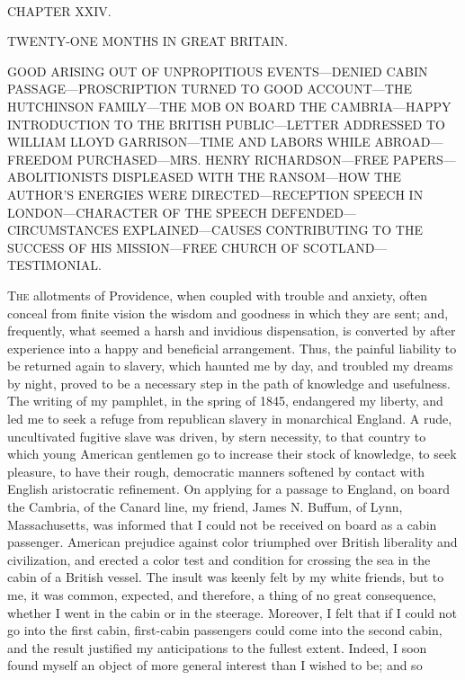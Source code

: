 {}

~

{CHAPTER XXIV.}

TWENTY-ONE MONTHS IN GREAT BRITAIN.

{GOOD ARISING OUT OF UNPROPITIOUS EVENTS---DENIED CABIN
PASSAGE---PROSCRIPTION TURNED TO GOOD ACCOUNT---THE HUTCHINSON
FAMILY---THE MOB ON BOARD THE CAMBRIA---HAPPY INTRODUCTION TO THE
BRITISH PUBLIC---LETTER ADDRESSED TO WILLIAM LLOYD GARRISON---TIME AND
LABORS WHILE ABROAD---FREEDOM PURCHASED---MRS. HENRY RICHARDSON---FREE
PAPERS---ABOLITIONISTS DISPLEASED WITH THE RANSOM---HOW THE AUTHOR'S
ENERGIES WERE DIRECTED---RECEPTION SPEECH IN LONDON---CHARACTER OF THE
SPEECH DEFENDED---CIRCUMSTANCES EXPLAINED---CAUSES CONTRIBUTING TO THE
SUCCESS OF HIS MISSION---FREE CHURCH OF SCOTLAND---TESTIMONIAL.}

\textsc{The} allotments of Providence, when coupled with trouble and
anxiety, often conceal from finite vision the wisdom and goodness in
which they are sent; and, frequently, what seemed a harsh and invidious
dispensation, is converted by after experience into a happy and
beneficial arrangement. Thus, the painful liability to be returned again
to slavery, which haunted me by day, and troubled my dreams by night,
proved to be a necessary step in the path of knowledge and usefulness.
The writing of my pamphlet, in the spring of 1845, endangered my
liberty, and led me to seek a refuge from republican slavery in
monarchical England. A rude, uncultivated fugitive slave was driven, by
stern necessity, to that country to which young American gentlemen go to
increase {}their stock of knowledge, to seek pleasure, to have their
rough, democratic manners softened by contact with English aristocratic
refinement. On applying for a passage to England, on board the Cambria,
of the Canard line, my friend, James N. Buffum, of Lynn, Massachusetts,
was informed that I could not be received on board as a cabin passenger.
American prejudice against color triumphed over British liberality and
civilization, and erected a color test and condition for crossing the
sea in the cabin of a British vessel. The insult was keenly felt by my
white friends, but to me, it was common, expected, and therefore, a
thing of no great consequence, whether I went in the cabin or in the
steerage. Moreover, I felt that if I could not go into the first cabin,
first-cabin passengers could come into the second cabin, and the result
justified my anticipations to the fullest extent. Indeed, I soon found
myself an object of more general interest than I wished to be; and so

